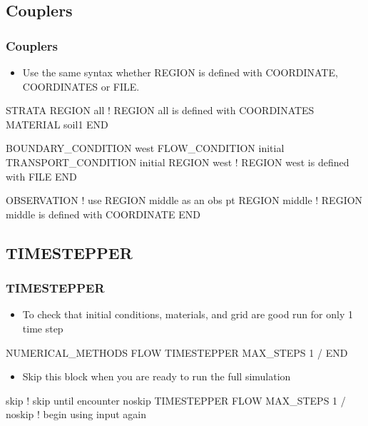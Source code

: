 \documentclass{beamer}
\newcommand\bluecomment[1]{{{\color{blue} #1}}}
\newcommand\greencomment[1]{{{\color{green} #1}}}
\begin{document}
\subsection{Couplers}

\begin{frame}[fragile]\frametitle{Couplers}

\begin{itemize}
\item Use the same syntax whether REGION is defined with COORDINATE, COORDINATES or FILE.
\end{itemize}

\begin{semiverbatim}

STRATA
  REGION all \bluecomment{! REGION \greencomment{all} is defined with COORDINATES}
  MATERIAL soil1
END

BOUNDARY_CONDITION west
  FLOW_CONDITION initial
  TRANSPORT_CONDITION initial
  REGION west \bluecomment{! REGION \greencomment{west} is defined with FILE}
END

OBSERVATION \bluecomment{! use REGION \greencomment{middle} as an obs pt}
  REGION middle \bluecomment{! REGION \greencomment{middle} is defined with COORDINATE}
END
\end{semiverbatim}

\end{frame}

\subsection{TIMESTEPPER}

\begin{frame}[fragile]\frametitle{TIMESTEPPER}

\begin{itemize}
\item To check that initial conditions, materials, and grid are good run for only 1 time step
\end{itemize}

\begin{semiverbatim}
NUMERICAL_METHODS FLOW
  TIMESTEPPER
    MAX_STEPS 1
  /
END
\end{semiverbatim}

\begin{itemize}
\item Skip this block when you are ready to run the full simulation
\end{itemize}

\begin{semiverbatim}
skip \bluecomment{! \greencomment{skip} until encounter \greencomment{noskip}}
  TIMESTEPPER FLOW
    MAX_STEPS 1
  /
noskip \bluecomment{! begin using input again}
\end{semiverbatim}

\end{frame}
\end{document}
